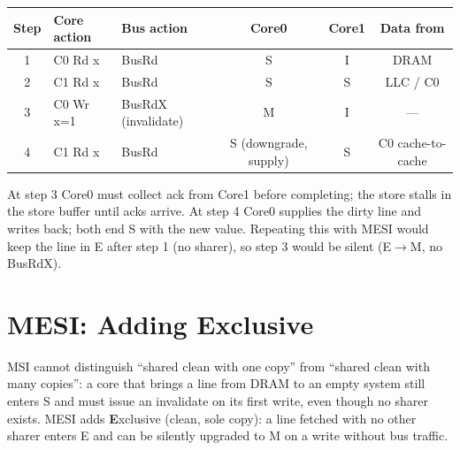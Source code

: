 \begin{center}
\begin{tabular}{cllccc}
\toprule Step & Core action & Bus action & Core0 & Core1 & Data from \\ \midrule
1 & C0 Rd x & BusRd & S & I & DRAM \\
2 & C1 Rd x & BusRd & S & S & LLC / C0 \\
3 & C0 Wr x=1 & BusRdX (invalidate) & M & I & --- \\
4 & C1 Rd x & BusRd & S (downgrade, supply) & S & C0 cache-to-cache \\ \bottomrule
\end{tabular}
\end{center}
At step 3 Core0 must collect ack from Core1 before completing; the store stalls in the store buffer until acks arrive. At step 4 Core0 supplies the dirty line and writes back; both end S with the new value. Repeating this with MESI would keep the line in E after step 1 (no sharer), so step 3 would be silent (E$\to$M, no BusRdX).

\section{MESI: Adding Exclusive}
MSI cannot distinguish ``shared clean with one copy'' from ``shared clean with many copies'': a core that brings a line from DRAM to an empty system still enters S and must issue an invalidate on its first write, even though no sharer exists. MESI adds \textbf{E}xclusive (clean, sole copy): a line fetched with no other sharer enters E and can be silently upgraded to M on a write without bus traffic.

